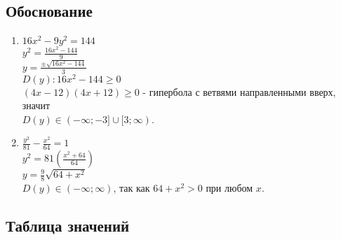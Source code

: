 \documentclass[a4paper, 12pt, oneside]{article}
\begin{document}
    \subsection{Обоснование}
    \begin{enumerate}
        \item $16x^2 - 9y^2 = 144$\\
        $y^2 = \frac{16x^2 - 144}{9}$\\
        $y = \frac{\pm \sqrt{16x^2 - 144}}{3}$\\
        $D(y): 16x^2 - 144 \geq 0$\\
        $(4x - 12)(4x + 12) \geq 0$ - гипербола с ветвями направленными вверх, значит\\
        $D(y) \in (-\infty; -3] \cup [3; \infty)$.\\

        \item $\frac{y^2}{81} - \frac{x^2}{64} = 1$\\
        $y^2 = 81(\frac{x^2 + 64}{64})$\\
        $y = \frac{9}{8}\sqrt{64 + x^2}$\\
        $D(y) \in (-\infty; \infty)$, так как $64 + x^2 > 0$ при любом $x$.\\
    \end{enumerate}

    \subsection{Таблица значений}
\end{document}
